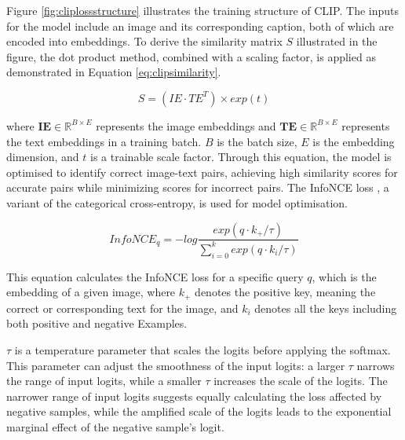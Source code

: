 Figure \ref{fig:cliplossstructure} illustrates the training structure of CLIP. The inputs for the model include an image and its corresponding caption, both of which are encoded into embeddings. To derive the similarity matrix $S$ illustrated in the figure, the dot product method, combined with a scaling factor, is applied as demonstrated in Equation \ref{eq:clipsimilarity}. 

\begin{equation}
    \label{eq:clipsimilarity}
    S = (IE \cdot TE^T) \times exp(t)
\end{equation}

where $\mathbf{IE} \in \mathbb{R}^{B \times E}$ represents the image embeddings and $\mathbf{TE} \in \mathbb{R}^{B \times E}$ represents the text embeddings in a training batch. $B$ is the batch size, $E$ is the embedding dimension, and $t$ is a trainable scale factor. Through this equation, the model is optimised to identify correct image-text pairs, achieving high similarity scores for accurate pairs while minimizing scores for incorrect pairs. The InfoNCE loss \parencite{oord2019representation}, a variant of the categorical cross-entropy, is used for model optimisation.

\begin{equation}
    \label{eq:infonce}
    InfoNCE_q = -log \frac{exp(q \cdot k_+ / \tau)}{\sum_{i=0}^{k}{exp(q \cdot k_i / \tau)}}
\end{equation}

This equation calculates the InfoNCE loss for a specific query $q$, which is the embedding of a given image, where $k_+$ denotes the positive key, meaning the correct or corresponding text for the image, and $k_i$ denotes all the keys including both positive and negative Examples. 

$\tau$ is a temperature parameter that scales the logits before applying the softmax. This parameter can adjust the smoothness of the input logits: a larger $\tau$ narrows the range of input logits, while a smaller $\tau$ increases the scale of the logits. The narrower range of input logits suggests equally calculating the loss affected by negative samples, while the amplified scale of the logits leads to the exponential marginal effect of the negative sample's logit.



